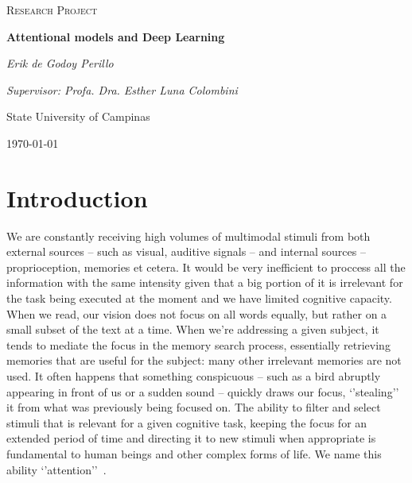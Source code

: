 \documentclass[article]{IEEEtran}
\begin{document}
\begin{titlepage}
	\centering
	{\scshape\Large Research Project\par}
	\vspace{1.5cm}
	{\huge \bfseries Attentional models and Deep Learning\par}
	\vspace{1cm}
	{\itshape Erik de Godoy Perillo\par}
	{\itshape Supervisor: Profa. Dra. Esther Luna Colombini\par}
	\vspace{0.5cm}
	\begin{abstract}
        Attention is a fundamental mechanism in intelligent beings.
        It is necessary for filtering the big and constant volumes of stimuli
        we receive and for selecting information that is
        important for a certain task.
        Deep Learning is currently broadly applied to Artificial Intelligence.
        The use of attention and Deep Learning
        has been increasingly frequent, resulting many times in
        better results for the task being addressed.
        In this context, this work proposes the elaboration of
        attentional models based on Deep Learning for problems in Artificial
        Intelligence.
        We aim at obtaining frameworks more generically applicable in broad
        problem classes such as Computer Vision, Natural Language Processing,
        Differential Programming and others.
	\end{abstract}
	\vfill
	State University of Campinas
	\vfill
	{\large \today\par}
\end{titlepage}

\section{Introduction}
We are constantly receiving high volumes of multimodal stimuli
from both external sources -- such as visual, auditive signals --
 and internal sources -- proprioception, memories et cetera.
It would be very inefficient to proccess all the information with
the same intensity given that a big portion of it is irrelevant for
the task being executed at the moment and we have limited cognitive capacity.
When we read, our vision does not focus on all
words equally, but rather on a small subset of the text at a time.
When we're addressing a given subject, it tends to mediate the focus
in the memory search process, essentially retrieving memories that
are useful for the subject: many other irrelevant memories are not used.
It often happens that something conspicuous
-- such as a bird abruptly appearing in front of us or a sudden sound --
quickly draws our focus, `'stealing'' it from what was previously
being focused on.
The ability to filter and select stimuli that is relevant for a given
cognitive task, keeping the focus for an extended period of time and
directing it to new stimuli when appropriate is fundamental to
human beings and other complex forms of life.
We name this ability `'attention''~\cite{ref:esther-thesis}.
\end{document}
